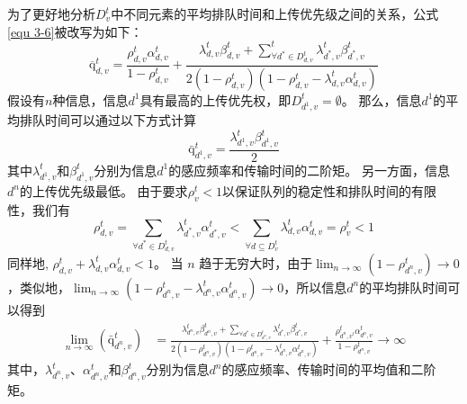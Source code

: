 为了更好地分析$D_v^t$中不同元素的平均排队时间和上传优先级之间的关系，公式\ref{equ 3-6}被改写为如下：
\begin{equation}
\overline{\mathrm{q}}_{d, v}^t=\frac{\rho_{d, v}^t \alpha_{d, v}^t}{1-\rho_{d, v}^t}+\frac{\lambda_{d, v}^t \beta_{d, v}^t+\sum_{\forall d^* \in D_{d, v}^t}^t \lambda_{d^*, v}^t \beta_{d^*, v}^t}{2\left(1-\rho_{d, v}^t\right)\left(1-\rho_{d, v}^t-\lambda_{d, v}^t \alpha_{d, v}^t\right)}
\end{equation}
假设有$n$种信息，信息${d^1}$具有最高的上传优先权，即$D_{d^1, v}^t = \emptyset$。
那么，信息${d^1}$的平均排队时间可以通过以下方式计算
\begin{equation}
\operatorname{\bar{q}}_{d^{1}, v}^t=\frac{\lambda_{d^1, v}^t \beta_{d^1, v}^t}{2}
\end{equation}
其中$\lambda_{d^1, v}^t$和$\beta_{d^1, v}^t$分别为信息$d^1$的感应频率和传输时间的二阶矩。
另一方面，信息${d^n}$的上传优先级最低。
由于要求$\rho_v^t < 1$以保证队列的稳定性和排队时间的有限性，我们有
\begin{equation}
\rho_{d, v}^t=\sum_{\forall d^* \in D_{d, v}^t} \lambda_{d^*, v}^t \alpha_{d^*, v}^t<\sum_{\forall d \subseteq D_v^t} \lambda_{d, v}^t \alpha_{d, v}^t=\rho_v^t<1
\end{equation}
同样地, $\rho_{d, v}^t+\lambda_{d, v}^t \alpha_{d, v}^t<1$。
当 $n$ 趋于无穷大时，由于$\lim _{n \rightarrow \infty}(1-\rho_{d^n, v}^t) \rightarrow 0$，类似地，$\lim _{n \rightarrow \infty}(1-\rho_{d^n, v}^t-\lambda_{d^n, v}^t \alpha_{d^n, v}^t) \rightarrow 0$，所以信息${d^n}$的平均排队时间可以得到
\begin{equation}
\begin{aligned}
	\lim _{n \rightarrow \infty}\left(\mathrm{\bar{q}}_{d^n, v}^t\right)&=\frac{\lambda_{d^n, v}^t \beta_{d^n, v}^t+\sum_{\forall d^* \in D_{d^n, v}^t} \lambda_{d^*, v}^t \beta_{d^*, v}^t}{2\left(1-\rho_{d^n, v}^t\right)\left(1-\rho_{d^n, v}^t-\lambda_{d^n, v}^t \alpha_{d^n, v}^t\right)} + \frac{\rho_{d^n, v^t}^t \alpha_{d^n, v}^t}{1-\rho_{d^n, v}^t}\rightarrow \infty
\end{aligned}
\end{equation}
其中，$\lambda_{d^n, v}^t$、$\alpha_{d^n, v}^t$和$\beta_{d^n, v}^t$分别为信息$d^n$的感应频率、传输时间的平均值和二阶矩。


